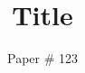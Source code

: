 \documentclass[10pt,twocolumn]{article}
\begin{document}
\title{\bf Title}
\author{Paper \# 123}
\date{}
\maketitle
\thispagestyle{empty}














 
\end{document}
